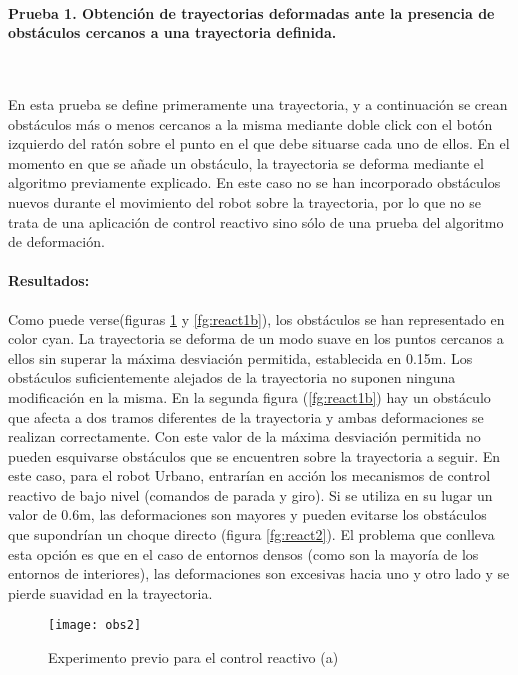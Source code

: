 \paragraph{Prueba 1. Obtención de trayectorias deformadas ante la presencia de obstáculos cercanos a una trayectoria definida.}\ %

\noindent
En esta prueba se define primeramente una trayectoria, y a continuación se crean obstáculos más o menos cercanos a la misma mediante doble click con el botón izquierdo del ratón sobre el punto en el que debe situarse cada uno de ellos. En el momento en que se añade un obstáculo, la trayectoria se deforma mediante el algoritmo previamente explicado. En este caso no se han incorporado obstáculos nuevos durante el movimiento del robot sobre la trayectoria, por lo que no se trata de una aplicación de control reactivo sino sólo de una prueba del algoritmo de deformación.


\paragraph{Resultados:}
Como puede verse(figuras \ref{fg:react1a} y \ref{fg:react1b}), los obstáculos se han representado en color cyan. La trayectoria se deforma de un modo suave en los puntos cercanos a ellos sin superar la máxima desviación permitida, establecida en 0.15m. Los obstáculos suficientemente alejados de la trayectoria no suponen ninguna modificación en la misma. En la segunda figura (\ref{fg:react1b}) hay un obstáculo que afecta a dos tramos diferentes de la trayectoria y ambas deformaciones se realizan correctamente. Con este valor de la máxima desviación permitida no pueden esquivarse obstáculos que se encuentren sobre la trayectoria a seguir. En este caso, para el robot Urbano, entrarían en acción los mecanismos de control reactivo de bajo nivel (comandos de parada y giro). Si se utiliza en su lugar un valor de 0.6m, las deformaciones son mayores y pueden evitarse los obstáculos que supondrían un choque directo (figura \ref{fg:react2}). El problema que conlleva esta opción es que en el caso de entornos densos (como son la mayoría de los entornos de interiores), las deformaciones son excesivas hacia uno y otro lado y se pierde suavidad en la trayectoria.

\begin{figure}[h]
  \centering\texttt{[image: obs2]}\\
    \caption{Experimento previo para el control reactivo (a)}\label{fg:react1a}
  \end{figure}


